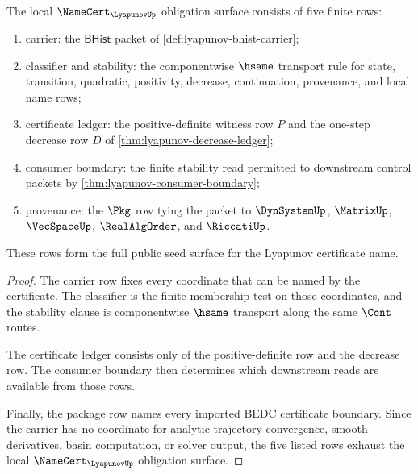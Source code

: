 \begin{theorem}
\label{thm:lyapunov-namecert-obligation-surface}
The local $\NameCert_{\LyapunovUp}$ obligation surface consists of five finite
rows:
\begin{enumerate}
\item carrier: the $\mathsf{BHist}$ packet of
\autoref{def:lyapunov-bhist-carrier};
\item classifier and stability: the componentwise $\hsame$ transport rule for
state, transition, quadratic, positivity, decrease, continuation, provenance,
and local name rows;
\item certificate ledger: the positive-definite witness row $P$ and the
one-step decrease row $D$ of
\autoref{thm:lyapunov-decrease-ledger};
\item consumer boundary: the finite stability read permitted to downstream
control packets by \autoref{thm:lyapunov-consumer-boundary};
\item provenance: the $\Pkg$ row tying the packet to $\DynSystemUp$,
$\MatrixUp$, $\VecSpaceUp$, $\RealAlgOrder$, and $\RiccatiUp$.
\end{enumerate}
These rows form the full public seed surface for the Lyapunov certificate name.
\end{theorem}
\begin{proof}
The carrier row fixes every coordinate that can be named by the certificate.
The classifier is the finite membership test on those coordinates, and the
stability clause is componentwise $\hsame$ transport along the same $\Cont$
routes.

The certificate ledger consists only of the positive-definite row and the
decrease row. The consumer boundary then determines which downstream reads are
available from those rows.

Finally, the package row names every imported BEDC certificate boundary. Since
the carrier has no coordinate for analytic trajectory convergence, smooth
derivatives, basin computation, or solver output, the five listed rows exhaust
the local $\NameCert_{\LyapunovUp}$ obligation surface.
\end{proof}

